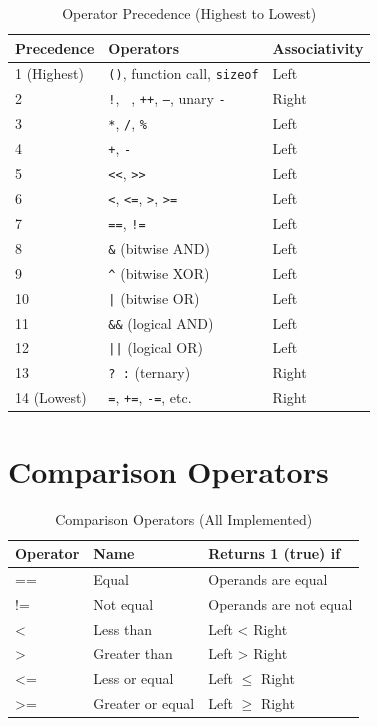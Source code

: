\documentclass[12pt,a4paper,oneside]{book}
\newcommand{\code}[1]{\texttt{#1}}
\begin{document}
\begin{table}[H]
\centering
\caption{Operator Precedence (Highest to Lowest)}
\small
\begin{tabular}{|l|l|l|}
\hline
\textbf{Precedence} & \textbf{Operators} & \textbf{Associativity} \\
\hline
1 (Highest) & \code{()}, function call, \code{sizeof} & Left \\
2 & \code{!}, \code{~}, \code{++}, \code{--}, unary \code{-} & Right \\
3 & \code{*}, \code{/}, \code{\%} & Left \\
4 & \code{+}, \code{-} & Left \\
5 & \code{<<}, \code{>>} & Left \\
6 & \code{<}, \code{<=}, \code{>}, \code{>=} & Left \\
7 & \code{==}, \code{!=} & Left \\
8 & \code{\&} (bitwise AND) & Left \\
9 & \code{\^{}} (bitwise XOR) & Left \\
10 & \code{|} (bitwise OR) & Left \\
11 & \code{\&\&} (logical AND) & Left \\
12 & \code{||} (logical OR) & Left \\
13 & \code{? :} (ternary) & Right \\
14 (Lowest) & \code{=}, \code{+=}, \code{-=}, etc. & Right \\
\hline
\end{tabular}
\end{table}

\section{Comparison Operators}

\begin{table}[H]
\centering
\caption{Comparison Operators (All Implemented)}
\begin{tabularx}{\textwidth}{|l|l|X|}
\hline
\textbf{Operator} & \textbf{Name} & \textbf{Returns 1 (true) if} \\
\hline
== & Equal & Operands are equal \\
!= & Not equal & Operands are not equal \\
< & Less than & Left < Right \\
> & Greater than & Left > Right \\
<= & Less or equal & Left $\leq$ Right \\
>= & Greater or equal & Left $\geq$ Right \\
\hline
\end{tabularx}
\end{table}
\end{document}
